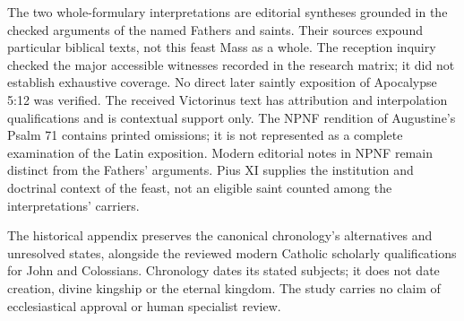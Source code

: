 The two whole-formulary interpretations are editorial syntheses grounded in the checked arguments of the named Fathers and saints. Their sources expound particular biblical texts, not this feast Mass as a whole. The reception inquiry checked the major accessible witnesses recorded in the research matrix; it did not establish exhaustive coverage. No direct later saintly exposition of Apocalypse 5:12 was verified. The received Victorinus text has attribution and interpolation qualifications and is contextual support only. The NPNF rendition of Augustine's Psalm 71 contains printed omissions; it is not represented as a complete examination of the Latin exposition. Modern editorial notes in NPNF remain distinct from the Fathers' arguments. Pius XI supplies the institution and doctrinal context of the feast, not an eligible saint counted among the interpretations' carriers.

The historical appendix preserves the canonical chronology's alternatives and unresolved states, alongside the reviewed modern Catholic scholarly qualifications for John and Colossians. Chronology dates its stated subjects; it does not date creation, divine kingship or the eternal kingdom. The study carries no claim of ecclesiastical approval or human specialist review.


